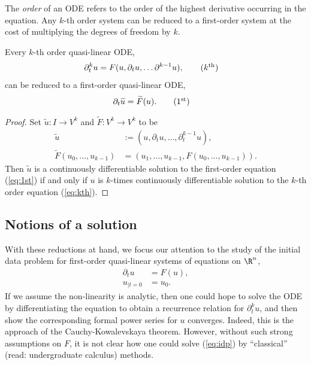 The \emph{order} of an ODE refers to the order of the highest derivative occurring in the equation. Any $k$-th order system can be reduced to a first-order system at the cost of multiplying the degrees of freedom by $k$. 

\begin{proposition}
	Every $k$-th order quasi-linear ODE, 
		\begin{align}
			\partial_t^k  u
				&= F(u, \partial_t u, \dots \partial^{k - 1} u),
				\tag{$k^{\text{th}}$}
				\label{eq:kth}
		\end{align}
	can be reduced to a first-order quasi-linear ODE,
		\begin{align}
			\partial_t \widetilde u
				&= \widetilde F (u). 
				\tag{$1^{\text{st}}$}
				\label{eq:1st}
		\end{align}
\end{proposition}

\begin{proof}
	Set $\widetilde u : I \to V^k$ and $\widetilde F: V^k \to V^k$ to be
		\begin{align*}
			\widetilde u 
				&:= (u, \partial_t u, \dots, \partial_t^{k - 1} u) ,\\
			\widetilde F (u_0, \dots, u_{k - 1})
				&= (u_1, \dots, u_{k - 1}, F(u_0, \dots, u_{k - 1}))	.
		\end{align*}	
	Then $\widetilde u$ is a continuously differentiable solution to the first-order equation (\ref{eq:1st}) if and only if $u$ is $k$-times continuously differentiable solution to the $k$-th order equation (\ref{eq:kth}). 	
\end{proof}


\subsection{Notions of a solution}

With these reductions at hand, we focus our attention to the study of the initial data problem for first-order quasi-linear systems of equations on $\R^n$, 
\begin{equation}
	\begin{split}
		\partial_t u 	&= F(u), \\
		u_{|t = 0}		&= u_0.
	\end{split}\tag{IDP}	\label{eq:idp}
\end{equation}
If we assume the non-linearity is analytic, then one could hope to solve the ODE by differentiating the equation to obtain a recurrence relation for $\partial_t^k u$, and then show the corresponding formal power series for $u$ converges. Indeed, this is the approach of the Cauchy-Kowalevskaya theorem. However, without such strong assumptions on $F$, it is not clear how one could solve (\ref{eq:idp}) by ``classical'' (read: undergraduate calculus) methods. 

